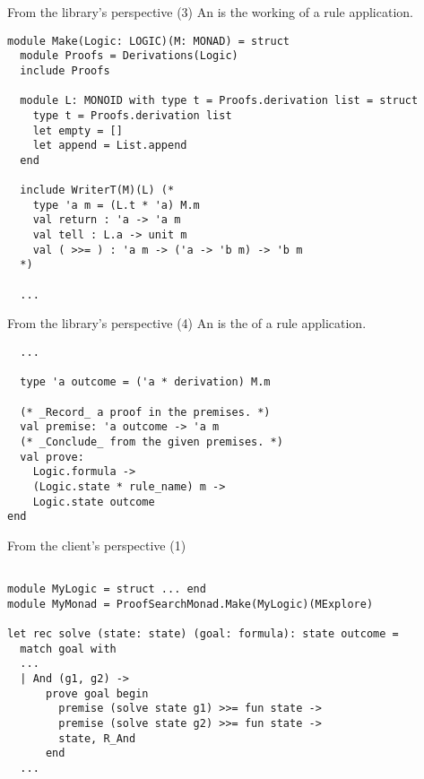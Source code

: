 \documentclass[final,xetex]{beamer}
\begin{document}
\begin{frame}[fragile]{From the library's perspective (3)}
  An  is the working  of a rule application.

  \vfill

  \begin{verbatim}
module Make(Logic: LOGIC)(M: MONAD) = struct
  module Proofs = Derivations(Logic)
  include Proofs

  module L: MONOID with type t = Proofs.derivation list = struct
    type t = Proofs.derivation list
    let empty = []
    let append = List.append
  end

  include WriterT(M)(L) (*
    type 'a m = (L.t * 'a) M.m
    val return : 'a -> 'a m
    val tell : L.a -> unit m
    val ( >>= ) : 'a m -> ('a -> 'b m) -> 'b m
  *)

  ...
  \end{verbatim}
\end{frame}

\begin{frame}[fragile]{From the library's perspective (4)}
  An  is the  of a rule application.

  \bigskip

  \begin{verbatim}
  ...

  type 'a outcome = ('a * derivation) M.m

  (* _Record_ a proof in the premises. *)
  val premise: 'a outcome -> 'a m
  (* _Conclude_ from the given premises. *)
  val prove:
    Logic.formula ->
    (Logic.state * rule_name) m ->
    Logic.state outcome
end
  \end{verbatim}
\end{frame}

\begin{frame}[fragile]{From the client's perspective (1)}
  \begin{verbatim}

module MyLogic = struct ... end
module MyMonad = ProofSearchMonad.Make(MyLogic)(MExplore)

let rec solve (state: state) (goal: formula): state outcome =
  match goal with
  ...
  | And (g1, g2) ->
      prove goal begin
        premise (solve state g1) >>= fun state ->
        premise (solve state g2) >>= fun state ->
        state, R_And
      end
  ...
  \end{verbatim}
\end{frame}
\end{document}
